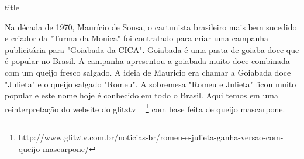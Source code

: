 \documentclass [11pt, letterpaper] {article}
\begin{document}
 {title}

Na década de 1970, Maur\'icio de Sousa, o cartunista brasileiro mais bem sucedido e criador da "Turma da Monica" foi contratado para criar uma campanha publicitária para "Goiabada da CICA". Goiabada é uma pasta de goiaba doce que é popular no Brasil. A campanha apresentou a goiabada muito doce combinada com um queijo fresco salgado. A ideia de Mauricio era chamar a Goiabada doce "Julieta" e o queijo salgado "Romeu". A sobremesa "Romeu e Julieta" ficou muito popular e este nome hoje \'e conhecido em todo o Brasil. Aqui temos em uma reinterpretação do website do glitztv ~ \footnote {http://www.glitztv.com.br/noticias-br/romeu-e-julieta-ganha-versao-com-queijo-mascarpone/} com base feita de queijo mascarpone.

\vspace {0.3in}
\end{document}
